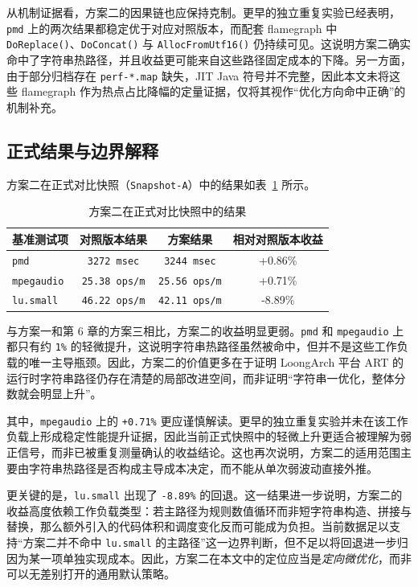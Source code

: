 从机制证据看，方案二的因果链也应保持克制。更早的独立重复实验已经表明，\texttt{pmd} 上的两次结果都稳定优于对应对照版本，而配套 flamegraph 中 \texttt{DoReplace()}、\texttt{DoConcat()} 与 \texttt{AllocFromUtf16()} 仍持续可见。这说明方案二确实命中了字符串热路径，并且收益更可能来自这些路径固定成本的下降。另一方面，由于部分归档存在 \texttt{perf-*.map} 缺失，JIT Java 符号并不完整，因此本文未将这些 flamegraph 作为热点占比降幅的定量证据，仅将其视作“优化方向命中正确”的机制补充。

\subsection{正式结果与边界解释}

方案二在正式对比快照（\texttt{Snapshot-A}）中的结果如表~\ref{tab:scheme2-result} 所示。

\begin{table}[htbp]
    \centering
    \small
    \caption{方案二在正式对比快照中的结果}
    \label{tab:scheme2-result}
    \begin{tabular}{lccc}
        \hline
        \textbf{基准测试项} & \textbf{对照版本结果} & \textbf{方案结果} & \textbf{相对对照版本收益} \\
        \hline
        \texttt{pmd} & \texttt{3272\,msec} & \texttt{3244\,msec} & +0.86\% \\
        \texttt{mpegaudio} & \texttt{25.38\,ops/m} & \texttt{25.56\,ops/m} & +0.71\% \\
        \texttt{lu.small} & \texttt{46.22\,ops/m} & \texttt{42.11\,ops/m} & -8.89\% \\
        \hline
    \end{tabular}
\end{table}

与方案一和第 6 章的方案三相比，方案二的收益明显更弱。\texttt{pmd} 和 \texttt{mpegaudio} 上都只有约 \texttt{1\%} 的轻微提升，这说明字符串热路径虽然被命中，但并不是这些工作负载的唯一主导瓶颈。因此，方案二的价值更多在于证明 LoongArch 平台 ART 的运行时字符串路径仍存在清楚的局部改进空间，而非证明“字符串一优化，整体分数就会明显上升”。

其中，\texttt{mpegaudio} 上的 \texttt{+0.71\%} 更应谨慎解读。更早的独立重复实验并未在该工作负载上形成稳定性能提升证据，因此当前正式快照中的轻微上升更适合被理解为弱正信号，而非已被重复测量确认的收益结论。这也再次说明，方案二的适用范围主要由字符串热路径是否构成主导成本决定，而不能从单次弱波动直接外推。

更关键的是，\texttt{lu.small} 出现了 \texttt{-8.89\%} 的回退。这一结果进一步说明，方案二的收益高度依赖工作负载类型：若主路径为规则数值循环而非短字符串构造、拼接与替换，那么额外引入的代码体积和调度变化反而可能成为负担。当前数据足以支持“方案二并不命中 \texttt{lu.small} 的主路径”这一边界判断，但不足以将回退进一步归因为某一项单独实现成本。因此，方案二在本文中的定位应当是\emph{定向微优化}，而非可以无差别打开的通用默认策略。

